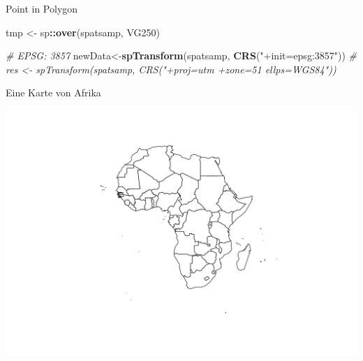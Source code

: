\documentclass[ignorenonframetext,]{beamer}
\newenvironment{Shaded}{\begin{snugshade}}{\end{snugshade}}
\newcommand{\KeywordTok}[1]{\textcolor[rgb]{0.13,0.29,0.53}{\textbf{#1}}}
\newcommand{\DecValTok}[1]{\textcolor[rgb]{0.00,0.00,0.81}{#1}}
\newcommand{\StringTok}[1]{\textcolor[rgb]{0.31,0.60,0.02}{#1}}
\newcommand{\CommentTok}[1]{\textcolor[rgb]{0.56,0.35,0.01}{\textit{#1}}}
\newcommand{\OperatorTok}[1]{\textcolor[rgb]{0.81,0.36,0.00}{\textbf{#1}}}
\newcommand{\NormalTok}[1]{#1}
\begin{document}
\begin{frame}[fragile]{Point in Polygon}

\begin{Shaded}
\begin{Highlighting}[]
\NormalTok{tmp <-}\StringTok{ }\NormalTok{sp}\OperatorTok{::}\KeywordTok{over}\NormalTok{(spatsamp, VG250)}
\end{Highlighting}
\end{Shaded}

\begin{Shaded}
\begin{Highlighting}[]
\CommentTok{# EPSG: 3857}
\NormalTok{newData<-}\KeywordTok{spTransform}\NormalTok{(spatsamp, }\KeywordTok{CRS}\NormalTok{(}\StringTok{"+init=epsg:3857"}\NormalTok{))}
\CommentTok{# res <- spTransform(spatsamp, CRS("+proj=utm +zone=51 ellps=WGS84"))}
\end{Highlighting}
\end{Shaded}

\end{frame}

\begin{frame}[fragile]{Eine Karte von Afrika}

\begin{Shaded}
\end{Shaded}

\includegraphics{spdep_files/figure-beamer/unnamed-chunk-8-1.pdf}

\end{frame}
\end{document}
